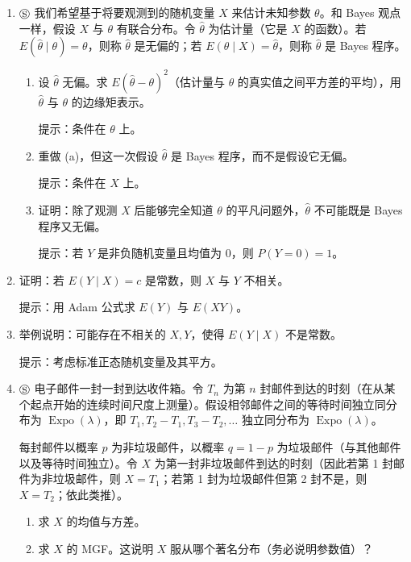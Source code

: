 \documentclass[UTF8, 12pt, fontset=fandol, oneside]{ctexart}
\begin{document}
\begin{enumerate}
  \item $\circledS$ 我们希望基于将要观测到的随机变量 $X$ 来估计未知参数 $\theta$。和 Bayes 观点一样，假设 $X$ 与 $\theta$ 有联合分布。令 $\hat\theta$ 为估计量（它是 $X$ 的函数）。若 $E(\hat\theta\mid \theta)=\theta$，则称 $\hat\theta$ 是无偏的；若 $E(\theta\mid X)=\hat\theta$，则称 $\hat\theta$ 是 Bayes 程序。
  \begin{enumerate}
    \item[(a)] 设 $\hat\theta$ 无偏。求 $E(\hat\theta-\theta)^2$（估计量与 $\theta$ 的真实值之间平方差的平均），用 $\hat\theta$ 与 $\theta$ 的边缘矩表示。

    \noindent 提示：条件在 $\theta$ 上。

    \item[(b)] 重做 (a)，但这一次假设 $\hat\theta$ 是 Bayes 程序，而不是假设它无偏。

    \noindent 提示：条件在 $X$ 上。

    \item[(c)] 证明：除了观测 $X$ 后能够完全知道 $\theta$ 的平凡问题外，$\hat\theta$ 不可能既是 Bayes 程序又无偏。

    \noindent 提示：若 $Y$ 是非负随机变量且均值为 $0$，则 $P(Y=0)=1$。
  \end{enumerate}

  \item 证明：若 $E(Y\mid X)=c$ 是常数，则 $X$ 与 $Y$ 不相关。

  \noindent 提示：用 Adam 公式求 $E(Y)$ 与 $E(XY)$。

  \item 举例说明：可能存在不相关的 $X,Y$，使得 $E(Y\mid X)$ 不是常数。

  \noindent 提示：考虑标准正态随机变量及其平方。

  \item $\circledS$ 电子邮件一封一封到达收件箱。令 $T_n$ 为第 $n$ 封邮件到达的时刻（在从某个起点开始的连续时间尺度上测量）。假设相邻邮件之间的等待时间独立同分布为 $\operatorname{Expo}(\lambda)$，即 $T_1,T_2-T_1,T_3-T_2,\ldots$ 独立同分布为 $\operatorname{Expo}(\lambda)$。

  每封邮件以概率 $p$ 为非垃圾邮件，以概率 $q=1-p$ 为垃圾邮件（与其他邮件以及等待时间独立）。令 $X$ 为第一封非垃圾邮件到达的时刻（因此若第 1 封邮件为非垃圾邮件，则 $X=T_1$；若第 1 封为垃圾邮件但第 2 封不是，则 $X=T_2$；依此类推）。
  \begin{enumerate}
    \item[(a)] 求 $X$ 的均值与方差。
    \item[(b)] 求 $X$ 的 MGF。这说明 $X$ 服从哪个著名分布（务必说明参数值）？
  \end{enumerate}


\end{enumerate}
\end{document}
